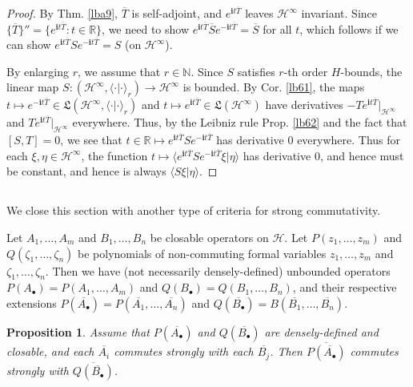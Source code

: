 \documentclass[12pt,b5paper,notitlepage]{article}
\theoremstyle{definition}
\theoremstyle{plain}
\newtheorem{pp}[df]{Proposition}
\newcommand{\fk}{\mathfrak}
\newcommand{\mc}{\mathcal}
\newcommand{\ovl}{\overline}
\newcommand{\bk}[1]{\langle {#1}\rangle}
\newcommand{\im}{\mathbf{i}}
\newcommand{\blt}{\bullet}
\newcommand{\Nbb}{\mathbb N}
\newcommand{\Rbb}{\mathbb R}
\numberwithin{equation}{section}
\begin{document}
\begin{proof}
By Thm. \ref{lba9}, $\ovl T$ is self-adjoint, and $e^{\im t\ovl T}$ leaves $\mc H^\infty$ invariant. Since $\{\ovl T\}''=\{e^{\im t\ovl T}:t\in\Rbb\}$, we need to show $e^{\im t\ovl T}\ovl Se^{-\im t\ovl T}=\ovl S$ for all $t$, which follows if we can show $e^{\im t\ovl T}Se^{-\im t\ovl T}=S$ (on $\mc H^\infty$).

By enlarging $r$, we assume that $r\in\Nbb$. Since $S$ satisfies $r$-th order $H$-bounds, the linear map $S:(\mc H^\infty,\bk{\cdot|\cdot}_r)\rightarrow\mc H^\infty$ is bounded. By Cor. \ref{lb61}, the maps $t\mapsto e^{-\im t\ovl T}\in\fk L(\mc H^\infty,\bk{\cdot|\cdot}_r)$ and $t\mapsto e^{\im t\ovl T}\in\fk L(\mc H^\infty)$ have derivatives $-Te^{\im t\ovl T}|_{\mc H^\infty}$ and $Te^{\im t\ovl T}|_{\mc H^\infty}$ everywhere. Thus, by the Leibniz rule Prop. \ref{lb62} 
and the fact that $[S,T]=0$, we see that $t\in\Rbb\mapsto e^{\im t\ovl T}Se^{-\im t\ovl T}$ has derivative $0$ everywhere. Thus for each $\xi,\eta\in\mc H^\infty$, the function $t\mapsto \bk{e^{\im t\ovl T}Se^{-\im t\ovl T}\xi|\eta}$ has derivative $0$, and hence must be constant, and hence is always $\bk{S\xi|\eta}$.
\end{proof}


\subsection{}

We close this section with another type of criteria for strong commutativity. %


Let $A_1,\dots,A_m$ and $B_1,\dots,B_n$ be closable operators on $\mc H$. Let $P(z_1,\dots,z_m)$ and $Q(\zeta_1,\dots,\zeta_n)$ be polynomials of non-commuting formal variables $z_1,\dots,z_m$ and $\zeta_1,\dots,\zeta_n$. Then we have (not necessarily densely-defined) unbounded operators $P(A_\blt)=P(A_1,\dots,A_m)$ and $Q(B_\blt)=Q(B_1,\dots,B_n)$, and their respective extensions $P(\ovl {A_\blt})=P(\ovl {A_1},\dots,\ovl {A_n})$ and $Q(\ovl{B_\blt})=B(\ovl{B_1},\dots,\ovl{B_n})$.


\begin{pp}
Assume that $P(\ovl{A_\blt})$ and $Q(\ovl{B_\blt})$ are densely-defined and closable, and each $\ovl{A_i}$ commutes strongly with each $\ovl{B_j}$. Then $\ovl{P(\ovl{A_\blt})}$ commutes strongly with $\ovl{Q(\ovl{B_\blt})}$.
\end{pp}
\end{document}
